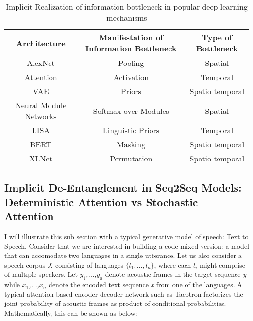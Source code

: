 \begin{center}
\begin{table}
\caption{Implicit Realization of information bottleneck in popular deep learning mechanisms}
\begin{tabular}{  | c | c | c| }
\hline
\textbf{Architecture} & \textbf{Manifestation of Information Bottleneck} & \textbf{Type of Bottleneck} \\
\hline
AlexNet & Pooling  & Spatial \\
 \hline 
Attention & Activation & Temporal\\
\hline
VAE & Priors & Spatio temporal\\
\hline
Neural Module Networks & Softmax over Modules & Spatial \\
\hline
LISA & Linguistic Priors & Temporal\\
\hline
BERT & Masking  & Spatio temporal\\ 
\hline
XLNet & Permutation & Spatio temporal \\
 \hline
\end{tabular}

\end{table}
\label{Message}
\end{center}


\subsection{Implicit De-Entanglement in Seq2Seq Models: Deterministic Attention vs Stochastic Attention}

I will illustrate this sub section with a typical generative model of speech: Text to Speech. Consider that we are interested in building a code mixed version: a model that can accomodate two languages in a single utterance. Let us also consider a speech corpus $X$ consisting of languages $\{ l_1,...,l_n \}$, where each $l_i$ might comprise of multiple speakers.  Let \textit{$y_1$,...,$y_n$} denote acoustic frames in the target sequence \textit{y}  while \textit{$x_1$,...,$x_n$} denote the encoded text sequence \textit{x} from one of the languages. A typical attention based encoder decoder network such as Tacotron\citep{tacotron_original} factorizes the joint probability of acoustic frames as product of conditional probabilities. Mathematically, this can be shown as below:

